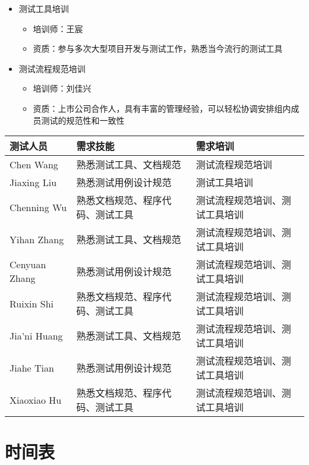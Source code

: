 \documentclass[hyperref, a4paper]{ctexart}
\providecommand{\tightlist}{%
  \setlength{\itemsep}{0pt}\setlength{\parskip}{0pt}}
\begin{document}
\begin{itemize}
\tightlist
\item
  测试工具培训

  \begin{itemize}
  \tightlist
  \item
    培训师：王宸
  \item
    资质：参与多次大型项目开发与测试工作，熟悉当今流行的测试工具
  \end{itemize}
\item
  测试流程规范培训

  \begin{itemize}
  \tightlist
  \item
    培训师：刘佳兴
  \item
    资质：上市公司合作人，具有丰富的管理经验，可以轻松协调安排组内成员测试的规范性和一致性
  \end{itemize}
\end{itemize}

\begin{tabular}{|p{2cm}|p{3.3cm}|p{8cm}|}
\hline
测试人员 & 需求技能 & 需求培训\\
\hline
Chen Wang & 熟悉测试工具、文档规范 & 测试流程规范培训\\
\hline
Jiaxing Liu & 熟悉测试用例设计规范 & 测试工具培训\\
\hline
Chenning Wu & 熟悉文档规范、程序代码、测试工具 & 测试流程规范培训、测试工具培训\\
\hline
Yihan Zhang & 熟悉测试工具、文档规范 & 测试流程规范培训、测试工具培训\\
\hline
Cenyuan Zhang & 熟悉测试用例设计规范 & 测试流程规范培训、测试工具培训\\
\hline
Ruixin Shi & 熟悉文档规范、程序代码、测试工具 & 测试流程规范培训、测试工具培训\\
\hline
Jia'ni Huang & 熟悉测试工具、文档规范 & 测试流程规范培训、测试工具培训\\
\hline
Jiahe Tian & 熟悉测试用例设计规范 & 测试流程规范培训、测试工具培训\\
\hline
Xiaoxiao Hu & 熟悉文档规范、程序代码、测试工具 & 测试流程规范培训、测试工具培训\\
\hline
\end{tabular}

\hypertarget{ux65f6ux95f4ux8868}{%
\section{时间表}\label{ux65f6ux95f4ux8868}}
\end{document}
